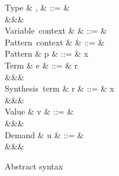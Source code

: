 \begin{figure}
\begin{syntaxfig}
\mbox{Type}
&
\sigma, \tau
&
::=
&
\tyVar{\alpha}
\mid
\tyZero
\mid
\tyUnit
\mid
{}
\mid
{}
\mid
{}
\mid
\\
&&&
\tyRec{\alpha}{\tau}
\\[1mm]
\mbox{Variable context}
&
\Gamma
&
::=
&
\cxtEmpty
\mid
{}
\\[1mm]
\mbox{Pattern context}
&
\Delta
&
::=
&
\cxtEmpty
\mid
{}
\\[1mm]
\mbox{Pattern}
&
p
&
::=
&
x
\mid
\exUnit
\mid
{}
\mid
{}
\mid
{}
\mid
{}
\\[1mm]
\mbox{Term}
&
e
&
::=
&
r
\mid
{}
\mid
{}
\mid
{}
\mid
\\
&&&
\mid
{}
\mid
{}
\mid
\\[1mm]
\mbox{Synthesis term}
&
r
&
::=
&
\mid
x
\mid
\exUnit
\mid
{}
\mid
{}
\mid
{}
\mid
\\
&&&
\\[1mm]
\mbox{Value}
&
v
&
::=
&
\mid
\exUnit
\mid
{}
\mid
{}
\mid
{}
\mid
\\
&&&
\mid
{}
\\[1mm]
\mbox{Demand}
&
u
&
::=
&
\bot
\mid
\exUnit
\mid
{}
\mid
{}
\mid
\exRecDemand
\mid
\\
&&&
\end{syntaxfig}
\caption{Abstract syntax}
\label{fig:syntax:values}
\end{figure}
